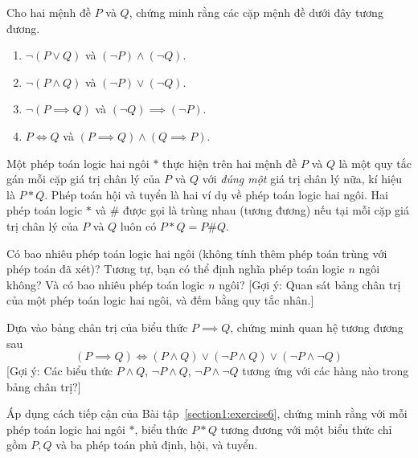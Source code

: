 \begin{exercise}\label{section1:exercise4}
    Cho hai mệnh đề $P$ và $Q$, chứng minh rằng các cặp mệnh đề dưới đây tương đương.
    \begin{enumerate}[label={(\alph*)},itemsep=0pt]
        \item $\neg (P\vee Q)$ và $(\neg P) \wedge (\neg Q)$.
        \item $\neg (P\wedge Q)$ và $(\neg P)\vee (\neg Q)$.
        \item $\neg (P\implies Q)$ và $(\neg Q)\implies (\neg P)$.
        \item $P\Leftrightarrow Q$ và $(P\implies Q) \wedge (Q\implies P)$.
    \end{enumerate}
\end{exercise}

\begin{exercise}\label{section1:exercise5}
    Một phép toán logic hai ngôi $*$ thực hiện trên hai mệnh đề $P$ và $Q$ là một quy tắc gán mỗi cặp giá trị chân lý của $P$ và $Q$ với \textit{đúng một} giá trị chân lý nữa, kí hiệu là $P * Q$. Phép toán hội và tuyển là hai ví dụ về phép toán logic hai ngôi. Hai phép toán logic $*$ và $\#$ được gọi là trùng nhau (tương đương) nếu tại mỗi cặp giá trị chân lý của $P$ và $Q$ luôn có $P * Q = P\# Q$.

    Có bao nhiêu phép toán logic hai ngôi (không tính thêm phép toán trùng với phép toán đã xét)? Tương tự, bạn có thể định nghĩa phép toán logic $n$ ngôi không? Và có bao nhiêu phép toán logic $n$ ngôi? [Gợi ý: Quan sát bảng chân trị của một phép toán logic hai ngôi, và đếm bằng quy tắc nhân.]
\end{exercise}

\begin{exercise}\label{section1:exercise6}
    Dựa vào bảng chân trị của biểu thức $P\implies Q$, chứng minh quan hệ tương đương sau
    \[
        (P\implies Q) \Leftrightarrow (P\wedge Q)\vee (\neg P\wedge Q) \vee (\neg P\wedge \neg Q)
    \]
    [Gợi ý: Các biểu thức $P\wedge Q$, $\neg P\wedge Q$, $\neg P\wedge \neg Q$ tương ứng với các hàng nào trong bảng chân trị?]
\end{exercise}

\begin{exercise}\label{section1:exercise7}
    Áp dụng cách tiếp cận của Bài tập~\ref{section1:exercise6}, chứng minh rằng với mỗi phép toán logic hai ngôi $*$, biểu thức $P * Q$ tương đương với một biểu thức chỉ gồm $P, Q$ và ba phép toán phủ định, hội, và tuyển.
\end{exercise}

